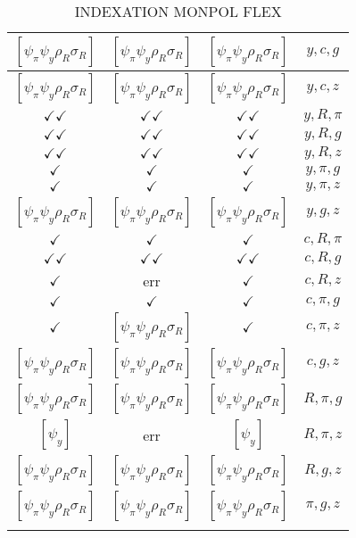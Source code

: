 \documentclass[a4paper,10pt]{article}
\begin{document}
\begin{longtable}{|c|c|c|c|}
\hline
$[\psi_\pi \psi_y \rho_R \sigma_R ]$ & $[\psi_\pi \psi_y \rho_R \sigma_R ]$ & $[\psi_\pi \psi_y \rho_R \sigma_R ]$ & ${y},{c},{g}$ \\
\hline
$[\psi_\pi \psi_y \rho_R \sigma_R ]$ & $[\psi_\pi \psi_y \rho_R \sigma_R ]$ & $[\psi_\pi \psi_y \rho_R \sigma_R ]$ & ${y},{c},{z}$ \\
\hline
$\checkmark\checkmark$ & $\checkmark\checkmark$ & $\checkmark\checkmark$ & ${y},{R},{\pi}$ \\
\hline
$\checkmark\checkmark$ & $\checkmark\checkmark$ & $\checkmark\checkmark$ & ${y},{R},{g}$ \\
\hline
$\checkmark\checkmark$ & $\checkmark\checkmark$ & $\checkmark\checkmark$ & ${y},{R},{z}$ \\
\hline
$\checkmark$ & $\checkmark$ & $\checkmark$ & ${y},{\pi},{g}$ \\
\hline
$\checkmark$ & $\checkmark$ & $\checkmark$ & ${y},{\pi},{z}$ \\
\hline
$[\psi_\pi \psi_y \rho_R \sigma_R ]$ & $[\psi_\pi \psi_y \rho_R \sigma_R ]$ & $[\psi_\pi \psi_y \rho_R \sigma_R ]$ & ${y},{g},{z}$ \\
\hline
$\checkmark$ & $\checkmark$ & $\checkmark$ & ${c},{R},{\pi}$ \\
\hline
$\checkmark\checkmark$ & $\checkmark\checkmark$ & $\checkmark\checkmark$ & ${c},{R},{g}$ \\
\hline
$\checkmark$ & err & $\checkmark$ & ${c},{R},{z}$ \\
\hline
$\checkmark$ & $\checkmark$ & $\checkmark$ & ${c},{\pi},{g}$ \\
\hline
$\checkmark$ & $[\psi_\pi \psi_y \rho_R \sigma_R ]$ & $\checkmark$ & ${c},{\pi},{z}$ \\
\hline
$[\psi_\pi \psi_y \rho_R \sigma_R ]$ & $[\psi_\pi \psi_y \rho_R \sigma_R ]$ & $[\psi_\pi \psi_y \rho_R \sigma_R ]$ & ${c},{g},{z}$ \\
\hline
$[\psi_\pi \psi_y \rho_R \sigma_R ]$ & $[\psi_\pi \psi_y \rho_R \sigma_R ]$ & $[\psi_\pi \psi_y \rho_R \sigma_R ]$ & ${R},{\pi},{g}$ \\
\hline
$[\psi_y ]$ & err & $[\psi_y ]$ & ${R},{\pi},{z}$ \\
\hline
$[\psi_\pi \psi_y \rho_R \sigma_R ]$ & $[\psi_\pi \psi_y \rho_R \sigma_R ]$ & $[\psi_\pi \psi_y \rho_R \sigma_R ]$ & ${R},{g},{z}$ \\
\hline
$[\psi_\pi \psi_y \rho_R \sigma_R ]$ & $[\psi_\pi \psi_y \rho_R \sigma_R ]$ & $[\psi_\pi \psi_y \rho_R \sigma_R ]$ & ${\pi},{g},{z}$ \\
\hline
\caption{INDEXATION MONPOL FLEX}
\label{table:MyTableLabel}
\end{longtable}
\end{document}
